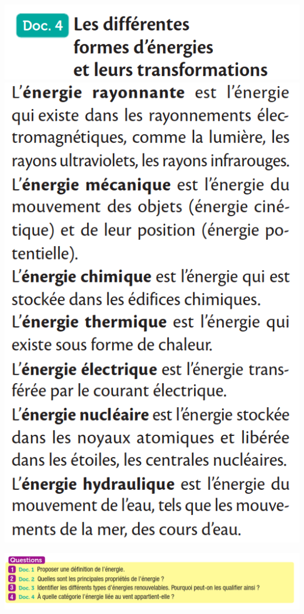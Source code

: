 \documentclass[10pt]{article}
\begin{document}
\begin{minipage}[c]{0.45\textwidth}
	\centering
	\includegraphics[scale=0.32]{assets/doc4a.png}
	\includegraphics[scale=0.32]{assets/doc4b.png}
\end{minipage}

\includegraphics[scale=0.4]{assets/q.png}
\end{document}
